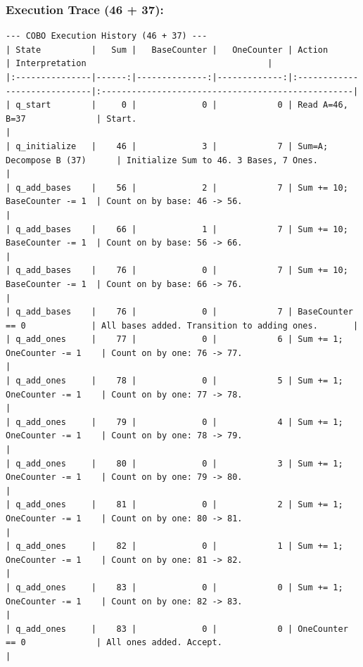 \documentclass[11pt]{article}
\begin{document}
\subsubsection*{Execution Trace (46 + 37):}
\begin{verbatim}
--- COBO Execution History (46 + 37) ---
| State          |   Sum |   BaseCounter |   OneCounter | Action                       | Interpretation                                    |
|:---------------|------:|--------------:|-------------:|:-----------------------------|:--------------------------------------------------|
| q_start        |     0 |             0 |            0 | Read A=46, B=37              | Start.                                            |
| q_initialize   |    46 |             3 |            7 | Sum=A; Decompose B (37)      | Initialize Sum to 46. 3 Bases, 7 Ones.            |
| q_add_bases    |    56 |             2 |            7 | Sum += 10; BaseCounter -= 1  | Count on by base: 46 -> 56.                       |
| q_add_bases    |    66 |             1 |            7 | Sum += 10; BaseCounter -= 1  | Count on by base: 56 -> 66.                       |
| q_add_bases    |    76 |             0 |            7 | Sum += 10; BaseCounter -= 1  | Count on by base: 66 -> 76.                       |
| q_add_bases    |    76 |             0 |            7 | BaseCounter == 0             | All bases added. Transition to adding ones.       |
| q_add_ones     |    77 |             0 |            6 | Sum += 1; OneCounter -= 1    | Count on by one: 76 -> 77.                        |
| q_add_ones     |    78 |             0 |            5 | Sum += 1; OneCounter -= 1    | Count on by one: 77 -> 78.                        |
| q_add_ones     |    79 |             0 |            4 | Sum += 1; OneCounter -= 1    | Count on by one: 78 -> 79.                        |
| q_add_ones     |    80 |             0 |            3 | Sum += 1; OneCounter -= 1    | Count on by one: 79 -> 80.                        |
| q_add_ones     |    81 |             0 |            2 | Sum += 1; OneCounter -= 1    | Count on by one: 80 -> 81.                        |
| q_add_ones     |    82 |             0 |            1 | Sum += 1; OneCounter -= 1    | Count on by one: 81 -> 82.                        |
| q_add_ones     |    83 |             0 |            0 | Sum += 1; OneCounter -= 1    | Count on by one: 82 -> 83.                        |
| q_add_ones     |    83 |             0 |            0 | OneCounter == 0              | All ones added. Accept.                           |
\end{verbatim}

\printbibliography
\end{document}
